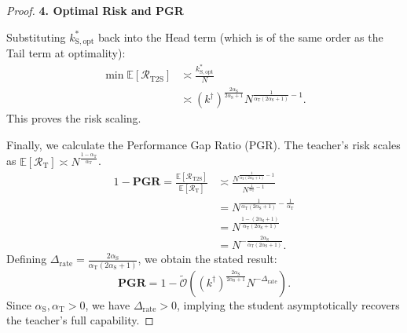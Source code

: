 \documentclass{article}
\theoremstyle{definition}
\theoremstyle{definition}
\theoremstyle{plain}
\theoremstyle{plain}
\theoremstyle{plain}
\theoremstyle{plain}
\theoremstyle{plain}
\newcommand{\Ex}{\mathbb{E}}
\newcommand{\te}{\mathrm{T}}
\newcommand{\st}{\mathrm{S}}
\begin{document}
\begin{proof}
    \textbf{4. Optimal Risk and PGR}
    
    Substituting $k^*_{\st, \mathrm{opt}}$ back into the Head term (which is of the same order as the Tail term at optimality):
    \begin{equation}
    \begin{aligned}
        \min \Ex[\mathcal{R}_{\mathrm{T2S}}] &\asymp \frac{k^*_{\st, \mathrm{opt}}}{N} \\
        &\asymp (k^\dagger)^{\frac{2\alpha_\st}{2\alpha_\st+1}} N^{\frac{1}{\alpha_\te(2\alpha_\st+1)} - 1}.
    \end{aligned}
    \end{equation}
    This proves the risk scaling.
    
    Finally, we calculate the Performance Gap Ratio (PGR). The teacher's risk scales as $\Ex[\mathcal{R}_\te] \asymp N^{\frac{1-\alpha_\te}{\alpha_\te}}$.
    \begin{equation}
    \begin{aligned}
        1 - \mathbf{PGR} = \frac{\Ex[\mathcal{R}_{\mathrm{T2S}}]}{\Ex[\mathcal{R}_\te]} &\asymp \frac{N^{\frac{1}{\alpha_\te(2\alpha_\st+1)} - 1}}{N^{\frac{1}{\alpha_\te} - 1}} \\
        &= N^{\frac{1}{\alpha_\te(2\alpha_\st+1)} - \frac{1}{\alpha_\te}} \\
        &= N^{\frac{1 - (2\alpha_\st+1)}{\alpha_\te(2\alpha_\st+1)}} \\
        &= N^{-\frac{2\alpha_\st}{\alpha_\te(2\alpha_\st+1)}}.
    \end{aligned}
    \end{equation}
    Defining $\Delta_{\mathrm{rate}} = \frac{2\alpha_\st}{\alpha_\te(2\alpha_\st+1)}$, we obtain the stated result:
    \begin{equation}
        \mathbf{PGR} = 1 - \tilde{\mathcal{O}}\left((k^\dagger)^{\frac{2\alpha_\st}{2\alpha_\st+1}} N^{-\Delta_{\mathrm{rate}}}\right).
    \end{equation}
    Since $\alpha_\st, \alpha_\te > 0$, we have $\Delta_{\mathrm{rate}} > 0$, implying the student asymptotically recovers the teacher's full capability.
\end{proof}



\end{document}
